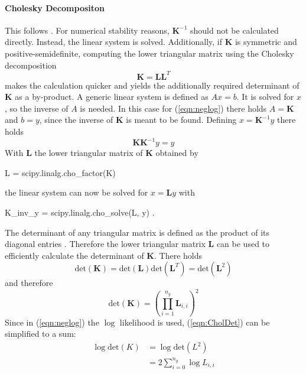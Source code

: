 \documentclass[%
  a4paper,oneside,%
  11pt,%
  smallchapters,
  style=printdev,
  extramargin,
  green,%
  rgb, <cmyk>
  ]{tubsbook}
\begin{document}
\paragraph{Cholesky Decompositon}
\label{sec:Cholesky}
This follows \cite[p.93-95]{chambers1998}.
For numerical stability reasons, $\bm{K}^{-1}$ should not be calculated directly. Instead, the linear system is solved. Additionally, if $\bm{K}$ is symmetric and positive-semidefinite, computing the lower triangular matrix using the Cholesky decomposition 
\begin{equation}
\bm{K} = \bm{L}\bm{L}^T
\end{equation}
makes the calculation quicker and yields the additionally required determinant of $\bm{K}$ as a by-product. 
A generic linear system is defined as $A x = b$. It is solved for $x$, so the inverse of $A$ is needed. In this case for (\ref{eqn:neglog}) there holds $A=\bm{K}$ and $b = y$, since the inverse of $\bm{K}$ is meant to be found. Defining $x = \bm{K}^{-1}y$ there holds
\begin{equation}
\bm{K} \bm{K}^{-1}  y = y
\end{equation}
%
With $\bm{L}$ the lower triangular matrix of $\bm{K}$ obtained by 
\begin{python}
L = scipy.linalg.cho_factor(K)
\end{python}
the linear system can now be solved for $x = \bm{L}y$ with
\begin{python}
K_inv_y = scipy.linalg.cho_solve(L, y) .
\end{python}

The determinant of any triangular matrix is defined as the product of its diagonal entries \cite{tomaskovic-moore}. Therefore the lower triangular matrix $\bm{L}$ can be used to efficiently calculate the determinant of $\bm{K}$. There holds
\begin{equation}
\mathrm{det} (\bm{K}) = \mathrm{det} (\bm{L}) \mathrm{det} (\bm{L}^T) = \mathrm{det} (\bm{L} ^2)
\end{equation}
and therefore
\begin{equation}
\mathrm{det} (\bm{K}) = \left(    \prod_{i=1}^{n_y}  \bm{L}_{i,i}  \right)^2
\label{eqn:CholDet}
\end{equation}
%
Since in (\ref{eqn:neglog}) the $\log$ likelihood is used, (\ref{eqn:CholDet}) can be simplified to a sum:
%
\begin{align*}
\log{\mathrm{det} (K)} &= \log{\mathrm{det} (L^2)} \\
&= 2 \sum_{i=0}^{n_y} \log{L_{i,i}}
\end{align*}
\end{document}
